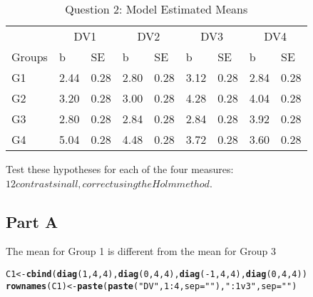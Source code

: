 \documentclass{article}\usepackage[]{graphicx}\usepackage[]{color}
\makeatletter
\newcommand{\hlnum}[1]{\textcolor[rgb]{0.686,0.059,0.569}{#1}}%
\newcommand{\hlstr}[1]{\textcolor[rgb]{0.192,0.494,0.8}{#1}}%
\newcommand{\hlopt}[1]{\textcolor[rgb]{0,0,0}{#1}}%
\newcommand{\hlstd}[1]{\textcolor[rgb]{0.345,0.345,0.345}{#1}}%
\newcommand{\hlkwb}[1]{\textcolor[rgb]{0.69,0.353,0.396}{#1}}%
\newcommand{\hlkwc}[1]{\textcolor[rgb]{0.333,0.667,0.333}{#1}}%
\newcommand{\hlkwd}[1]{\textcolor[rgb]{0.737,0.353,0.396}{\textbf{#1}}}%
\newenvironment{kframe}{%
 \def\at@end@of@kframe{}%
 \ifinner\ifhmode%
  \def\at@end@of@kframe{\end{minipage}}%
  \begin{minipage}{\columnwidth}%
 \fi\fi%
 \def\FrameCommand##1{\hskip\@totalleftmargin \hskip-\fboxsep
 \colorbox{shadecolor}{##1}\hskip-\fboxsep
     \hskip-\linewidth \hskip-\@totalleftmargin \hskip\columnwidth}%
 \MakeFramed {\advance\hsize-\width
   \@totalleftmargin\z@ \linewidth\hsize
   \@setminipage}}%
 {\par\unskip\endMakeFramed%
 \at@end@of@kframe}
\newenvironment{knitrout}{}{} %
\makeatother
\begin{document}
\begin{table}
\caption{\label{tab:unnamed-chunk-6}Question 2: Model Estimated Means}
\centering
\begin{tabular}[t]{lllllllll}
\toprule
\multicolumn{1}{c}{ } & \multicolumn{2}{c}{DV1} & \multicolumn{2}{c}{DV2} & \multicolumn{2}{c}{DV3} & \multicolumn{2}{c}{DV4} \\
\cmidrule(l{2pt}r{2pt}){2-3} \cmidrule(l{2pt}r{2pt}){4-5} \cmidrule(l{2pt}r{2pt}){6-7} \cmidrule(l{2pt}r{2pt}){8-9}
Groups & b & SE & b & SE & b & SE & b & SE\\
\midrule
G1 & 2.44 & 0.28 & 2.80 & 0.28 & 3.12 & 0.28 & 2.84 & 0.28\\
G2 & 3.20 & 0.28 & 3.00 & 0.28 & 4.28 & 0.28 & 4.04 & 0.28\\
G3 & 2.80 & 0.28 & 2.84 & 0.28 & 2.84 & 0.28 & 3.92 & 0.28\\
G4 & 5.04 & 0.28 & 4.48 & 0.28 & 3.72 & 0.28 & 3.60 & 0.28\\
\bottomrule
\end{tabular}
\end{table}



Test these hypotheses for each of the four measures: \(12 contrasts in all, correct using the Holm method\).

\subsection{Part A}
The mean for Group 1 is different from the mean for Group 3
\begin{knitrout}
\color{fgcolor}\begin{kframe}
\begin{alltt}
\hlstd{C1} \hlkwb{<-} \hlkwd{cbind}\hlstd{(}\hlkwd{diag}\hlstd{(}\hlnum{1}\hlstd{,} \hlnum{4}\hlstd{,} \hlnum{4}\hlstd{),} \hlkwd{diag}\hlstd{(}\hlnum{0}\hlstd{,} \hlnum{4}\hlstd{,} \hlnum{4}\hlstd{),} \hlkwd{diag}\hlstd{(}\hlopt{-}\hlnum{1}\hlstd{,} \hlnum{4}\hlstd{,} \hlnum{4}\hlstd{),} \hlkwd{diag}\hlstd{(}\hlnum{0}\hlstd{,}\hlnum{4}\hlstd{,}\hlnum{4}\hlstd{))}
\hlkwd{rownames}\hlstd{(C1)} \hlkwb{<-} \hlkwd{paste}\hlstd{(}\hlkwd{paste}\hlstd{(}\hlstr{"DV"}\hlstd{,} \hlnum{1}\hlopt{:}\hlnum{4}\hlstd{,} \hlkwc{sep} \hlstd{=} \hlstr{""}\hlstd{),} \hlstr{": 1 v 3"}\hlstd{,} \hlkwc{sep} \hlstd{=} \hlstr{""}\hlstd{)}
\end{alltt}
\end{kframe}
\end{knitrout}
\end{document}
